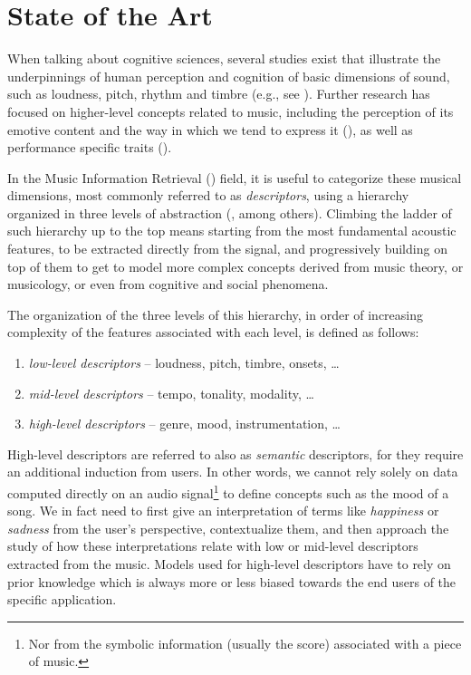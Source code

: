 \chapter{State of the Art}\label{ch:sota}
When talking about cognitive sciences, several studies exist that illustrate the underpinnings of human perception and cognition of basic dimensions of sound, such as loudness, pitch, rhythm and timbre (e.g., see \cite{justus2002music}). Further research has focused on higher-level concepts related to music, including the perception of its emotive content and the way in which we tend to express it (\cite{juslin2004expression}), as well as performance specific traits (\cite{palmer1997music}).

In the Music Information Retrieval () field, it is useful to categorize these musical dimensions, most commonly referred to as \emph{descriptors}, using a hierarchy organized in three levels of abstraction (\cite{gouyon2008content}, among others). Climbing the ladder of such hierarchy up to the top means starting from the most fundamental acoustic features, to be extracted directly from the signal, and progressively building on top of them to get to model more complex concepts derived from music theory, or musicology, or even from cognitive and social phenomena.

The organization of the three levels of this hierarchy, in order of increasing complexity of the features associated with each level, is defined as follows:

\begin{enumerate}
	\item \emph{low-level descriptors} -- loudness, pitch, timbre, onsets, \ldots
	\item \emph{mid-level descriptors} -- tempo, tonality, modality, \ldots
	\item \emph{high-level descriptors} -- genre, mood, instrumentation, \ldots
\end{enumerate}

High-level descriptors are referred to also as \emph{semantic} descriptors, for they require an additional induction from users. In other words, we cannot rely solely on data computed directly on an audio signal\footnote{Nor from the symbolic information (usually the score) associated with a piece of music.} to define concepts such as the mood of a song. We in fact need to first give an interpretation of terms like \emph{happiness} or \emph{sadness} from the user's perspective, contextualize them, and then approach the study of how these interpretations relate with low or mid-level descriptors extracted from the music. Models used for high-level descriptors have to rely on prior knowledge which is always more or less biased towards the end users of the specific application.

